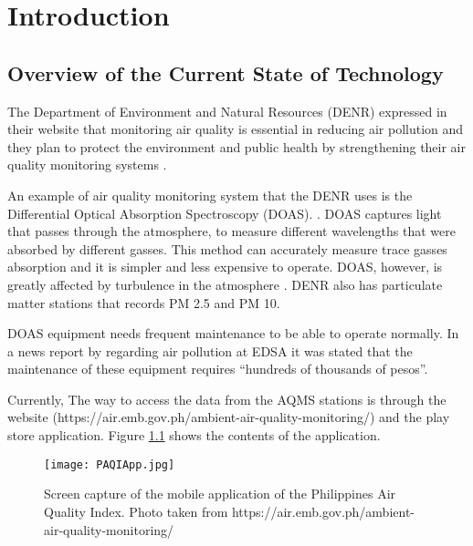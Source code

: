 \chapter{Introduction}
\label{sec:researchdesc}    %

\section{Overview of the Current State of Technology}
\label{sec:overview}
The Department of Environment and Natural Resources (DENR) expressed in their website that monitoring air quality is essential in reducing air pollution and they plan to protect the environment and public health by strengthening their air quality monitoring systems \cite{DENR2020}.

An example of air quality monitoring system that the DENR uses is the Differential Optical Absorption Spectroscopy (DOAS). \cite{DENR_ND}. DOAS captures light that passes through the atmosphere, to measure different wavelengths that were absorbed by different gasses. This method can accurately measure trace gasses absorption and it is simpler and less expensive to operate. DOAS, however, is greatly affected by turbulence in the atmosphere \cite{PlattEtAl2008}. DENR also has particulate matter stations that records PM 2.5 and PM 10. \cite{DENR_ND}

DOAS equipment needs frequent maintenance to be able to operate normally. In a news report by \cite{enano_subingsubing_2019} regarding air pollution at EDSA it was stated that the maintenance of these equipment requires “hundreds of thousands of pesos”.

Currently, The way to access the data from the AQMS stations is through the website (https://air.emb.gov.ph/ambient-air-quality-monitoring/) and the play store application. Figure \ref{fig:PAQIApp} shows the contents of the application.\\

  
\begin{figure}[t]                %
   \centering                    %
   \texttt{[image: PAQIApp.jpg]}      %
   \caption{Screen capture of the mobile application of the Philippines Air Quality Index. Photo taken from https://air.emb.gov.ph/ambient-air-quality-monitoring/ 
}
    \label{fig:PAQIApp}
\end{figure}


